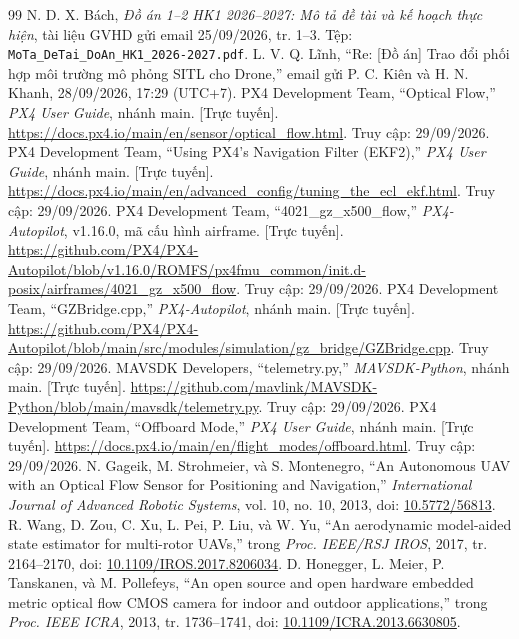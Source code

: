\documentclass[a4paper,12pt]{article}
\newcommand{\code}[1]{\texttt{#1}}
\begin{document}
\clearpage
{}
\begingroup{}\fontsize{11.5}{14}\selectfont
\begin{thebibliography}{99}
 N. D. X. Bách, \textit{Đồ án 1–2 HK1 2026–2027: Mô tả đề tài và kế hoạch thực hiện}, tài liệu GVHD gửi email 25/09/2026, tr. 1–3. Tệp: \code{MoTa\_DeTai\_DoAn\_HK1\_2026-2027.pdf}.
 L. V. Q. Lĩnh, “Re: [Đồ án] Trao đổi phối hợp môi trường mô phỏng SITL cho Drone,” email gửi P. C. Kiên và H. N. Khanh, 28/09/2026, 17:29 (UTC+7).
 PX4 Development Team, “Optical Flow,” \textit{PX4 User Guide}, nhánh main. [Trực tuyến]. \url{https://docs.px4.io/main/en/sensor/optical_flow.html}. Truy cập: 29/09/2026.
 PX4 Development Team, “Using PX4's Navigation Filter (EKF2),” \textit{PX4 User Guide}, nhánh main. [Trực tuyến]. \url{https://docs.px4.io/main/en/advanced_config/tuning_the_ecl_ekf.html}. Truy cập: 29/09/2026.
 PX4 Development Team, “4021\_gz\_x500\_flow,” \textit{PX4-Autopilot}, v1.16.0, mã cấu hình airframe. [Trực tuyến]. \url{https://github.com/PX4/PX4-Autopilot/blob/v1.16.0/ROMFS/px4fmu_common/init.d-posix/airframes/4021_gz_x500_flow}. Truy cập: 29/09/2026.
 PX4 Development Team, “GZBridge.cpp,” \textit{PX4-Autopilot}, nhánh main. [Trực tuyến]. \url{https://github.com/PX4/PX4-Autopilot/blob/main/src/modules/simulation/gz_bridge/GZBridge.cpp}. Truy cập: 29/09/2026.
 MAVSDK Developers, “telemetry.py,” \textit{MAVSDK-Python}, nhánh main. [Trực tuyến]. \url{https://github.com/mavlink/MAVSDK-Python/blob/main/mavsdk/telemetry.py}. Truy cập: 29/09/2026.
 PX4 Development Team, “Offboard Mode,” \textit{PX4 User Guide}, nhánh main. [Trực tuyến]. \url{https://docs.px4.io/main/en/flight_modes/offboard.html}. Truy cập: 29/09/2026.
 N. Gageik, M. Strohmeier, và S. Montenegro, “An Autonomous UAV with an Optical Flow Sensor for Positioning and Navigation,” \textit{International Journal of Advanced Robotic Systems}, vol. 10, no. 10, 2013, doi: \href{https://doi.org/10.5772/56813}{10.5772/56813}.
 R. Wang, D. Zou, C. Xu, L. Pei, P. Liu, và W. Yu, “An aerodynamic model-aided state estimator for multi-rotor UAVs,” trong \textit{Proc. IEEE/RSJ IROS}, 2017, tr. 2164–2170, doi: \href{https://doi.org/10.1109/IROS.2017.8206034}{10.1109/IROS.2017.8206034}.
 D. Honegger, L. Meier, P. Tanskanen, và M. Pollefeys, “An open source and open hardware embedded metric optical flow CMOS camera for indoor and outdoor applications,” trong \textit{Proc. IEEE ICRA}, 2013, tr. 1736–1741, doi: \href{https://doi.org/10.1109/ICRA.2013.6630805}{10.1109/ICRA.2013.6630805}.

\end{thebibliography}
\end{document}
